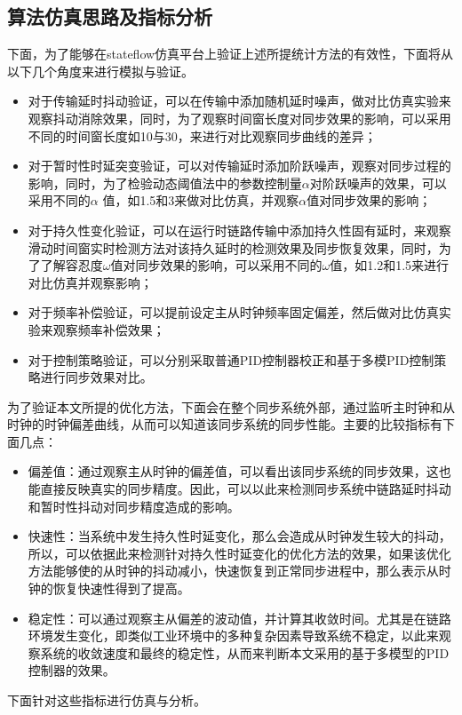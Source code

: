\subsection{算法仿真思路及指标分析}
下面，为了能够在stateflow仿真平台上验证上述所提统计方法的有效性，下面将从以下几个角度来进行模拟与验证。
\begin{itemize}[noitemsep,topsep=0pt,parsep=0pt,partopsep=0pt]
  \item 对于传输延时抖动验证，可以在传输中添加随机延时噪声，做对比仿真实验来观察抖动消除效果，同时，为了观察时间窗长度对同步效果的影响，可以采用不同的时间窗长度如10与30，来进行对比观察同步曲线的差异；
  \item 对于暂时性时延突变验证，可以对传输延时添加阶跃噪声，观察对同步过程的影响，同时，为了检验动态阈值法中的参数控制量$\alpha$对阶跃噪声的效果，可以采用不同的$\alpha$ 值，如1.5和3来做对比仿真，并观察$\alpha$值对同步效果的影响；
  \item 对于持久性变化验证，可以在运行时链路传输中添加持久性固有延时，来观察滑动时间窗实时检测方法对该持久延时的检测效果及同步恢复效果，同时，为了了解容忍度$\omega$值对同步效果的影响，可以采用不同的$\omega$值，如1.2和1.5来进行对比仿真并观察影响；
  \item 对于频率补偿验证，可以提前设定主从时钟频率固定偏差，然后做对比仿真实验来观察频率补偿效果；
  \item 对于控制策略验证，可以分别采取普通PID控制器校正和基于多模PID控制策略进行同步效果对比。
\end{itemize}

为了验证本文所提的优化方法，下面会在整个同步系统外部，通过监听主时钟和从时钟的时钟偏差曲线，从而可以知道该同步系统的同步性能。主要的比较指标有下面几点：
\begin{itemize}[noitemsep,topsep=0pt,parsep=0pt,partopsep=0pt]
  \item 偏差值：通过观察主从时钟的偏差值，可以看出该同步系统的同步效果，这也能直接反映真实的同步精度。因此，可以以此来检测同步系统中链路延时抖动和暂时性抖动对同步精度造成的影响。
  \item 快速性：当系统中发生持久性时延变化，那么会造成从时钟发生较大的抖动，所以，可以依据此来检测针对持久性时延变化的优化方法的效果，如果该优化方法能够使的从时钟的抖动减小，快速恢复到正常同步进程中，那么表示从时钟的恢复快速性得到了提高。
  \item 稳定性：可以通过观察主从偏差的波动值，并计算其收敛时间。尤其是在链路环境发生变化，即类似工业环境中的多种复杂因素导致系统不稳定，以此来观察系统的收敛速度和最终的稳定性，从而来判断本文采用的基于多模型的PID控制器的效果。
\end{itemize}
下面针对这些指标进行仿真与分析。
\\ \\ \\ \\

